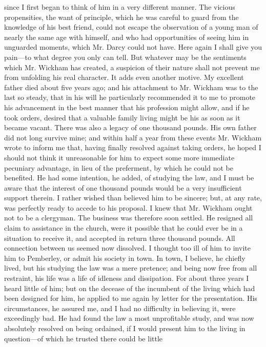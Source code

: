 \documentclass[10pt]{book}
\begin{document}
since I first began to think of him in a very different manner. The
vicious propensities, the want of principle, which he was careful to
guard from the knowledge of his best friend, could not escape the
observation of a young man of nearly the same age with himself, and who
had opportunities of seeing him in unguarded moments, which Mr. Darcy
could not have. Here again I shall give you pain—to what degree you
only can tell. But whatever may be the sentiments which Mr. Wickham has
created, a suspicion of their nature shall not prevent me from unfolding
his real character. It adds even another motive. My excellent father
died about five years ago; and his attachment to Mr. Wickham was to the
last so steady, that in his will he particularly recommended it to me to
promote his advancement in the best manner that his profession might
allow, and if he took orders, desired that a valuable family living
might be his as soon as it became vacant. There was also a legacy of
one
   thousand pounds. His own father did not long survive mine; and
within half a year from these events Mr. Wickham wrote to inform me
that, having finally resolved against taking orders, he hoped I should
not think it unreasonable for him to expect some more immediate
pecuniary advantage, in lieu of the preferment, by which he could not be
benefited. He had some intention, he added, of studying the law, and I
must be aware that the interest of one thousand pounds would be a very
insufficient support therein. I rather wished than believed him to be
sincere; but, at any rate, was perfectly ready to accede to his
proposal. I knew that Mr. Wickham ought not to be a clergyman. The
business was therefore soon settled. He resigned all claim to assistance
in the church, were it possible that he could ever be in a situation to
receive it, and accepted in return three thousand pounds. All connection
between us seemed now dissolved. I thought too ill of him to invite him
to Pemberley, or admit his society in town. In town, I believe, he
chiefly lived, but his studying the law was a mere pretence; and being
now free from all restraint, his life was a life of idleness and
dissipation. For about three years I heard little of him; but on the
decease of the incumbent of the living which had been designed for him,
he applied to me again by letter for the presentation. His
circumstances, he assured me, and I had no difficulty in believing it,
were exceedingly bad. He had found the law a most unprofitable study,
and was now absolutely resolved on being ordained, if I would present
him to the living in question—of which he trusted there could be little
\end{document}
